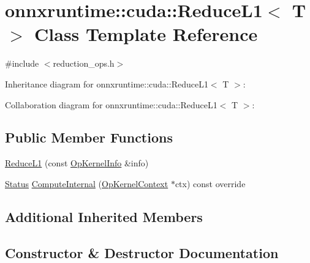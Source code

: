 \hypertarget{classonnxruntime_1_1cuda_1_1ReduceL1}{}\section{onnxruntime\+:\+:cuda\+:\+:Reduce\+L1$<$ T $>$ Class Template Reference}
\label{classonnxruntime_1_1cuda_1_1ReduceL1}


{\ttfamily \#include $<$reduction\+\_\+ops.\+h$>$}



Inheritance diagram for onnxruntime\+:\+:cuda\+:\+:Reduce\+L1$<$ T $>$\+:


Collaboration diagram for onnxruntime\+:\+:cuda\+:\+:Reduce\+L1$<$ T $>$\+:
\subsection*{Public Member Functions}
\begin{DoxyCompactItemize}
\item 
\mbox{\hyperlink{classonnxruntime_1_1cuda_1_1ReduceL1_a67b7e721f0929f7b2124b6121889962a}{Reduce\+L1}} (const \mbox{\hyperlink{classonnxruntime_1_1OpKernelInfo}{Op\+Kernel\+Info}} \&info)
\item 
\mbox{\hyperlink{classonnxruntime_1_1common_1_1Status}{Status}} \mbox{\hyperlink{classonnxruntime_1_1cuda_1_1ReduceL1_ad0f25c4efdb6681cec851e6415498150}{Compute\+Internal}} (\mbox{\hyperlink{classonnxruntime_1_1OpKernelContext}{Op\+Kernel\+Context}} $\ast$ctx) const override
\end{DoxyCompactItemize}
\subsection*{Additional Inherited Members}


\subsection{Constructor \& Destructor Documentation}
\mbox{\label{classonnxruntime_1_1cuda_1_1ReduceL1_a67b7e721f0929f7b2124b6121889962a}} 
